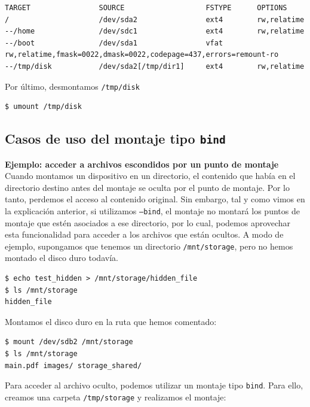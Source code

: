 \documentclass[a4paper, oneside, 12pt]{book}
\begin{document}
	\begin{verbatim}
TARGET                SOURCE                   FSTYPE      OPTIONS
/                     /dev/sda2                ext4        rw,relatime
--/home               /dev/sdc1                ext4        rw,relatime
--/boot               /dev/sda1                vfat
rw,relatime,fmask=0022,dmask=0022,codepage=437,errors=remount-ro
--/tmp/disk           /dev/sda2[/tmp/dir1]     ext4        rw,relatime
	\end{verbatim}

	\noindent Por último, desmontamos \texttt{/tmp/disk}
	
	\begin{verbatim}
$ umount /tmp/disk
	\end{verbatim}

	\subsection{Casos de uso del montaje tipo \texttt{bind}}
	
	\vspace{10px}
	
	\noindent \textbf{\large Ejemplo: acceder a archivos escondidos por un punto de montaje}\\
	
	\noindent Cuando montamos un dispositivo en un directorio, el contenido que había en el directorio destino antes del montaje se oculta por el punto de montaje. Por lo tanto, perdemos el acceso al contenido original. Sin embargo, tal y como vimos en la explicación anterior, si utilizamos \texttt{--bind}, el montaje no montará los puntos de montaje que estén asociados a ese directorio, por lo cual, podemos aprovechar esta funcionalidad para acceder a los archivos que están ocultos. A modo de ejemplo, supongamos que tenemos un directorio \texttt{/mnt/storage}, pero no hemos montado el disco duro todavía.
	
	\begin{verbatim}
$ echo test_hidden > /mnt/storage/hidden_file
$ ls /mnt/storage
hidden_file
	\end{verbatim}

	\noindent Montamos el disco duro en la ruta que hemos comentado:
	
	\begin{verbatim}
$ mount /dev/sdb2 /mnt/storage
$ ls /mnt/storage
main.pdf images/ storage_shared/ 
	\end{verbatim}

	\noindent Para acceder al archivo oculto, podemos utilizar un montaje tipo \texttt{bind}. Para ello, creamos una carpeta \texttt{/tmp/storage} y realizamos el montaje:
	
\end{document}
